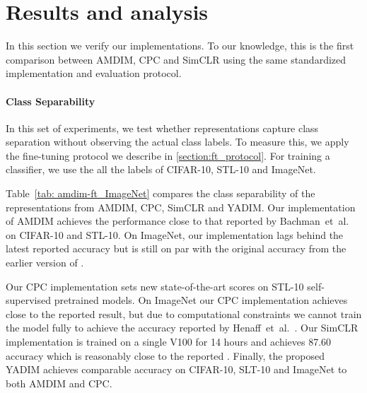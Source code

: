 \documentclass{article}
\begin{document}
\section{Results and analysis}

In this section we verify our implementations. To our knowledge, this is the first comparison between AMDIM, CPC and SimCLR using the same standardized implementation and evaluation protocol.

\paragraph{Class Separability}

In this set of experiments, we test whether representations capture class separation without observing the actual class labels. To measure this, we apply the fine-tuning protocol we describe in \ref{section:ft_protocol}. For training a classifier, we use the all the labels of CIFAR-10, STL-10 and ImageNet.

Table~\ref{tab: amdim-ft_ImageNet} compares the class separability of the representations from AMDIM, CPC, SimCLR and YADIM. Our implementation of AMDIM achieves the performance close to that reported by Bachman~et~al. on CIFAR-10 and STL-10. On ImageNet, our implementation lags behind the latest reported accuracy but is still on par with the original accuracy from the earlier version of \cite{bachman2019learning}.

Our CPC implementation sets new state-of-the-art scores on STL-10 self-supervised pretrained models. On ImageNet our CPC implementation achieves close to the reported result, but due to computational constraints we cannot train the model fully to achieve the accuracy reported by Henaff~et~al.~\cite{henaff2019data}. Our SimCLR implementation is trained on a single V100 for 14 hours and achieves 87.60 accuracy which is reasonably close to the reported . Finally, the proposed YADIM achieves comparable accuracy on CIFAR-10, SLT-10 and ImageNet to both AMDIM and CPC.
\end{document}
